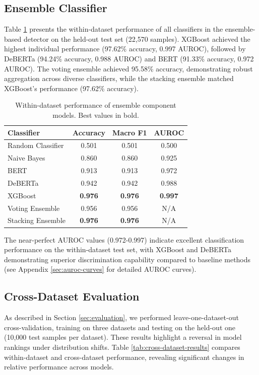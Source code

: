 \documentclass[11pt]{article}
\begin{document}
\subsection{Ensemble Classifier}
\label{sec:ensemble-classifier}

Table \ref{tab:within-dataset-ensemble} presents the within-dataset performance of all classifiers in the ensemble-based detector on the held-out test set (22,570 samples). XGBoost achieved the highest individual performance (97.62\% accuracy, 0.997 AUROC), followed by DeBERTa (94.24\% accuracy, 0.988 AUROC) and BERT (91.33\% accuracy, 0.972 AUROC). The voting ensemble achieved 95.58\% accuracy, demonstrating robust aggregation across diverse classifiers, while the stacking ensemble matched XGBoost's performance (97.62\% accuracy).

\begin{table}[t]
\centering
\footnotesize
\begin{tabular}{@{}lccc@{}}
\toprule
\textbf{Classifier} & \textbf{Accuracy} & \textbf{Macro F1} & \textbf{AUROC} \\
\midrule
Random Classifier & 0.501 & 0.501 & 0.500 \\
\midrule
Naive Bayes & 0.860 & 0.860 & 0.925 \\
BERT & 0.913 & 0.913 & 0.972 \\
DeBERTa & 0.942 & 0.942 & 0.988 \\
XGBoost & \textbf{0.976} & \textbf{0.976} & \textbf{0.997} \\
\midrule
Voting Ensemble & 0.956 & 0.956 & N/A \\
Stacking Ensemble & \textbf{0.976} & \textbf{0.976} & N/A \\
\bottomrule
\end{tabular}
\caption{Within-dataset performance of ensemble component models. Best values in bold.}
\label{tab:within-dataset-ensemble}
\end{table}

The near-perfect AUROC values (0.972-0.997) indicate excellent classification performance on the within-dataset test set, with XGBoost and DeBERTa demonstrating superior discrimination capability compared to baseline methods (see Appendix \ref{sec:auroc-curves} for detailed AUROC curves).

\subsection{Cross-Dataset Evaluation}
As described in Section \ref{sec:evaluation}, we performed leave-one-dataset-out cross-validation, training on three datasets and testing on the held-out one (10,000 test samples per dataset). These results highlight a reversal in model rankings under distribution shifts. Table \ref{tab:cross-dataset-results} compares within-dataset and cross-dataset performance, revealing significant changes in relative performance across models.
\end{document}
